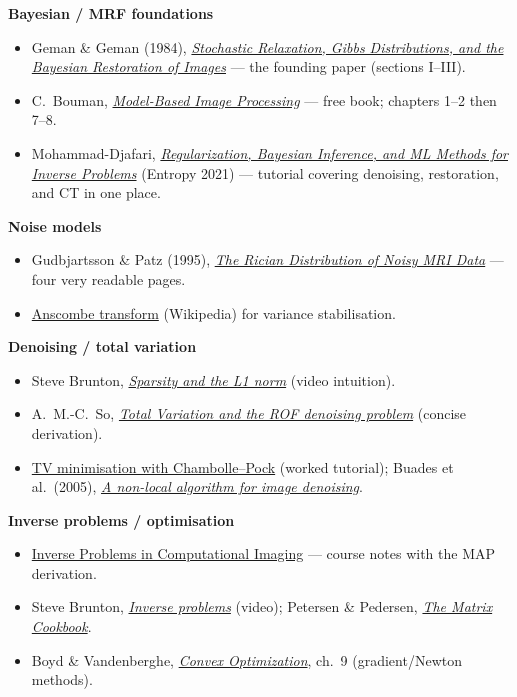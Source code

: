 \documentclass[11pt]{article}
\begin{document}
\textbf{Bayesian / MRF foundations}
\begin{itemize}[nosep,leftmargin=*]
  \item Geman \& Geman (1984), \href{https://doi.org/10.1109/TPAMI.1984.4767596}{\emph{Stochastic Relaxation, Gibbs Distributions, and the Bayesian Restoration of Images}} --- the founding paper (sections I--III).
  \item C.\ Bouman, \href{https://engineering.purdue.edu/~bouman/publications/pdf/MBIP-book.pdf}{\emph{Model-Based Image Processing}} --- free book; chapters 1--2 then 7--8.
  \item Mohammad-Djafari, \href{https://www.mdpi.com/1099-4300/23/12/1673}{\emph{Regularization, Bayesian Inference, and ML Methods for Inverse Problems}} (Entropy 2021) --- tutorial covering denoising, restoration, and CT in one place.
\end{itemize}

\textbf{Noise models}
\begin{itemize}[nosep,leftmargin=*]
  \item Gudbjartsson \& Patz (1995), \href{https://onlinelibrary.wiley.com/doi/10.1002/mrm.1910340618}{\emph{The Rician Distribution of Noisy MRI Data}} --- four very readable pages.
  \item \href{https://en.wikipedia.org/wiki/Anscombe_transform}{Anscombe transform} (Wikipedia) for variance stabilisation.
\end{itemize}

\textbf{Denoising / total variation}
\begin{itemize}[nosep,leftmargin=*]
  \item Steve Brunton, \href{https://www.youtube.com/watch?v=DLfMsBKaDOY}{\emph{Sparsity and the L1 norm}} (video intuition).
  \item A.\ M.-C.\ So, \href{https://angms.science/doc/TV/TV.pdf}{\emph{Total Variation and the ROF denoising problem}} (concise derivation).
  \item \href{https://sangillee.com/2026-01-06-total-variation-minimization/}{TV minimisation with Chambolle--Pock} (worked tutorial); Buades et al.\ (2005), \href{https://ieeexplore.ieee.org/document/1467423}{\emph{A non-local algorithm for image denoising}}.
\end{itemize}

\textbf{Inverse problems / optimisation}
\begin{itemize}[nosep,leftmargin=*]
  \item \href{https://computational-imaging.de/book/06_InverseProblemsInCompimg.html}{Inverse Problems in Computational Imaging} --- course notes with the MAP derivation.
  \item Steve Brunton, \href{https://www.youtube.com/watch?v=Jl3Ftf6S5MQ}{\emph{Inverse problems}} (video); Petersen \& Pedersen, \href{https://www.math.uwaterloo.ca/~hwolkowi/matrixcookbook.pdf}{\emph{The Matrix Cookbook}}.
  \item Boyd \& Vandenberghe, \href{https://web.stanford.edu/~boyd/cvxbook/}{\emph{Convex Optimization}}, ch.\ 9 (gradient/Newton methods).
\end{itemize}
\end{document}

